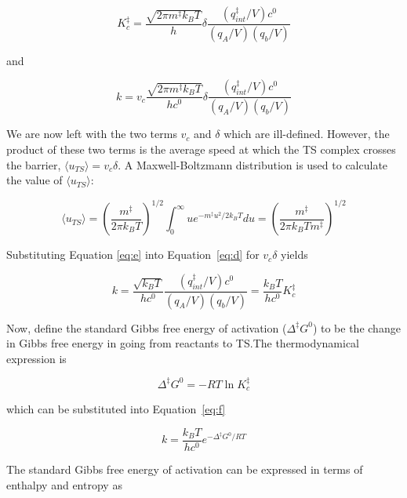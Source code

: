 \begin{equation}
  K_c^{\ddagger} =  \frac{\sqrt{2\pi m^\ddagger k_B T}}{h}\delta\frac{(q_{int}^\ddagger/V)c^0}{(q_A/V)(q_b/V)}
\end{equation}

\noindent and

\begin{equation}
 k = v_c \frac{\sqrt{2\pi m^\ddagger
     k_B T}}{hc^0}\delta\frac{(q_{int}^\ddagger/V)c^0}{(q_A/V)(q_b/V)}
\label{eq:d}
\end{equation}

We are now left with the two terms $v_c$ and $\delta$ which are ill-defined. However, the product of these two terms is the average speed at which the TS complex crosses the barrier, $\langle u_{TS} \rangle = v_c\delta$. A Maxwell-Boltzmann distribution is used to calculate the value of $\langle u_{TS} \rangle$:

\begin{equation}
  \langle u_{TS} \rangle = \left( \frac{m^\ddagger}{2\pi k_B T} \right)^{1/2}
  \int_0^\infty u e^{-m^\ddagger u^2/2k_B T}du = \left( \frac{m^\ddagger}{2\pi
      k_B T m^\ddagger} \right)^{1/2}
\label{eq:e}
\end{equation}

\noindent Substituting Equation \ref{eq:e} into Equation~\ref{eq:d} for $v_c\delta$ yields

\begin{equation}
  k =
  \frac{\sqrt{k_B T}}{hc^0}\frac{(q_{int}^\ddagger/V)c^0}{(q_A/V)(q_b/V)} = \frac{k_B T}{hc^0}K_c^\ddagger
\label{eq:f}
\end{equation}

Now, define the standard Gibbs free energy of activation ($\Delta ^\ddagger G^0$) to be the change in Gibbs free energy in going from reactants to TS.\@ The thermodynamical expression is

\begin{equation}
  \Delta ^\ddagger G^0 = -RT \ln K_c^\ddagger
\end{equation}

\noindent which can be substituted into Equation~\ref{eq:f}

\begin{equation}
  k = \frac{k_B T}{hc^0} e^{-\Delta^\ddagger G^0/RT}
\label{eq:g}
\end{equation}

The standard Gibbs free energy of activation can be expressed in terms of enthalpy and entropy as

